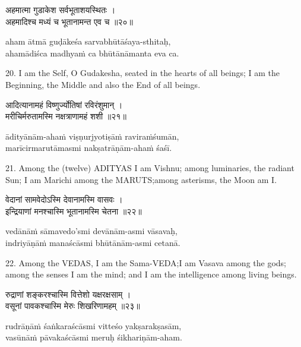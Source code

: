 \begin{gitaverse}
अहमात्मा गुडाकेश सर्वभूताशयस्थितः । \\
अहमादिश्च मध्यं च भूतानामन्त एव च ॥२०॥
\end{gitaverse}

\begin{transliteration}
aham ātmā guḍākeśa sarvabhūtāśaya-sthitaḥ, \\
ahamādiśca madhyaṁ ca bhūtānāmanta eva ca.
\end{transliteration}

20. I am the Self, O Gudakesha, seated in the hearts of all beings; I am the
Beginning, the Middle and also the End of all beings.

\begin{gitaverse}
आदित्यानामहं विष्णुर्ज्योतिषां रविरंशुमान् । \\
मरीचिर्मरुतामस्मि नक्षत्राणामहं शशी ॥२१॥
\end{gitaverse}

\begin{transliteration}
ādityānām-ahaṁ viṣṇurjyotiṣāṁ raviraṁśumān, \\
marīcirmarutāmasmi nakṣatrāṇām-ahaṁ śaśī.
\end{transliteration}

21. Among the (twelve) ADITYAS I am Vishnu; among luminaries, the radiant Sun;
I am Marichi among the MARUTS;\@ among asterisms, the Moon am I.\@

\begin{gitaverse}
वेदानां सामवेदोऽस्मि देवानामस्मि वासवः । \\
इन्द्रियाणां मनश्चास्मि भूतानामस्मि चेतना ॥२२॥
\end{gitaverse}

\begin{transliteration}
vedānāṁ sāmavedo'smi devānām-asmi vāsavaḥ, \\
indriyāṇāṁ manaścāsmi bhūtānām-asmi cetanā.
\end{transliteration}

22. Among the VEDAS, I am the Sama-VEDA;\@ I am Vasava among the gods; among the
senses I am the mind; and I am the intelligence among living beings.

\begin{gitaverse}
रुद्राणां शङ्करश्चास्मि वित्तेशो यक्षरक्षसाम् । \\
वसूनां पावकश्चास्मि मेरुः शिखरिणामहम् ॥२३॥
\end{gitaverse}

\begin{transliteration}
rudrāṇāṁ śaṅkaraścāsmi vitteśo yakṣarakṣasām, \\
vasūnāṁ pāvakaścāsmi meruḥ śikhariṇām-aham.
\end{transliteration}

